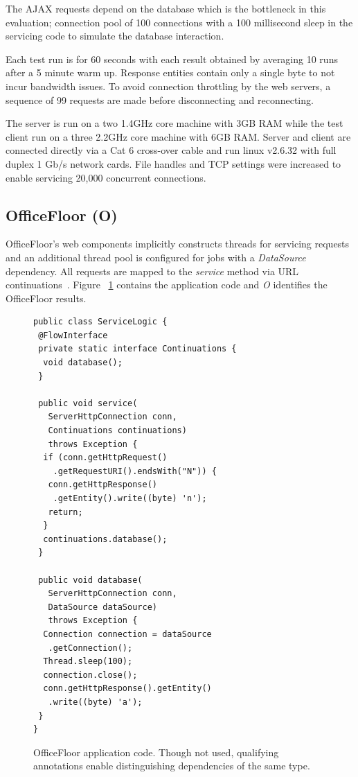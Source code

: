 \documentclass[conference]{ieee/IEEEtran}
\begin{document}
The AJAX requests depend on the database which is the bottleneck in this
evaluation; connection pool of 100 connections with a 100 millisecond sleep in
the servicing code to simulate the database interaction.

Each test run is for 60 seconds with each result obtained by averaging 10 runs
after a 5 minute warm up.  Response entities contain only a single byte to not
incur bandwidth issues.  To avoid connection throttling by the web servers, a
sequence of 99 requests are made before disconnecting and reconnecting.

The server is run on a two 1.4GHz core machine with 3GB RAM while the test
client run on a three 2.2GHz core machine with 6GB RAM.  Server and client are
connected directly via a Cat 6 cross-over cable and run linux v2.6.32 with full
duplex 1 Gb/s network cards.  File handles and TCP settings were increased to
enable servicing 20,000 concurrent connections.

\subsection{OfficeFloor (O)}
OfficeFloor's web components implicitly constructs threads for servicing
requests and an additional thread pool is configured for jobs with a
\textit{DataSource} dependency.  All requests are mapped to the \textit{service}
method via URL continuations~\cite{url-continuation}.  Figure
~\ref{fig:officefloor_code} contains the application code and \textit{O}
identifies the OfficeFloor results.

\begin{figure}[!t]
\begin{verbatim}
public class ServiceLogic {
 @FlowInterface
 private static interface Continuations {
  void database();
 }

 public void service(
   ServerHttpConnection conn, 
   Continuations continuations) 
   throws Exception { 
  if (conn.getHttpRequest()
    .getRequestURI().endsWith("N")) {
   conn.getHttpResponse()
    .getEntity().write((byte) 'n');
   return;
  }
  continuations.database();
 }

 public void database(
   ServerHttpConnection conn,
   DataSource dataSource) 
   throws Exception {
  Connection connection = dataSource
   .getConnection();
  Thread.sleep(100);
  connection.close();
  conn.getHttpResponse().getEntity()
   .write((byte) 'a');
 }
}
\end{verbatim}
\caption{OfficeFloor application code. Though not used, qualifying
annotations enable distinguishing dependencies of the same type.}
\label{fig:officefloor_code}
\end{figure}
\end{document}
